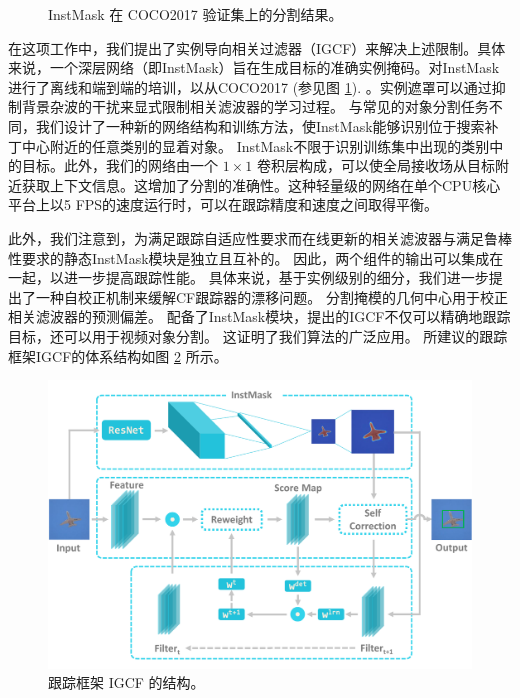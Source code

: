 \begin{figure}
                       \hspace{-0.6em}
    \caption{InstMask 在 COCO2017 \cite{COCO} 验证集上的分割结果。}
    \label{fig:InstMask}
\end{figure}

在这项工作中，我们提出了实例导向相关过滤器（IGCF）来解决上述限制。具体来说，一个深层网络（即InstMask）旨在生成目标的准确实例掩码。对InstMask进行了离线和端到端的培训，以从COCO2017 \cite{COCO} (参见图 \ref{fig:InstMask}). 。实例遮罩可以通过抑制背景杂波的干扰来显式限制相关滤波器的学习过程。
与常见的对象分割任务不同，我们设计了一种新的网络结构和训练方法，使InstMask能够识别位于搜索补丁中心附近的任意类别的显着对象。 InstMask不限于识别训练集中出现的类别中的目标。此外，我们的网络由一个 $1 \times 1$ 卷积层构成，可以使全局接收场从目标附近获取上下文信息。这增加了分割的准确性。这种轻量级的网络在单个CPU核心平台上以5 FPS的速度运行时，可以在跟踪精度和速度之间取得平衡。

此外，我们注意到，为满足跟踪自适应性要求而在线更新的相关滤波器与满足鲁棒性要求的静态InstMask模块是独立且互补的。 因此，两个组件的输出可以集成在一起，以进一步提高跟踪性能。 具体来说，基于实例级别的细分，我们进一步提出了一种自校正机制来缓解CF跟踪器的漂移问题。 分割掩模的几何中心用于校正相关滤波器的预测偏差。 配备了InstMask模块，提出的IGCF不仅可以精确地跟踪目标，还可以用于视频对象分割。 这证明了我们算法的广泛应用。 所建议的跟踪框架IGCF的体系结构如图 \ref{fig:IGCF} 所示。

\begin{figure}
    \centering
    \includegraphics[width=1.0\textwidth]{Img/IGCF/instmask1.pdf}
    \caption{跟踪框架 IGCF 的结构。}
    \label{fig:IGCF}
\end{figure}


